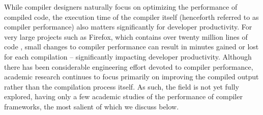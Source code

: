 While compiler designers naturally focus on optimizing the performance of compiled code, the execution time of the compiler itself (henceforth referred to as compiler performance) also matters significantly for developer productivity.
For very large projects such as Firefox, which contains over twenty million lines of code \cite{bastienabadieEngineeringCodeQuality}, small changes to compiler performance can result in minutes gained or lost for each compilation -- significantly impacting developer productivity. Although there has been considerable engineering effort devoted to compiler performance, academic research continues to focus primarily on improving the compiled output rather than the compilation process itself.
As such, the field is not yet fully explored, having only a few academic studies of the performance of compiler frameworks, the most salient of which we discuss below.

